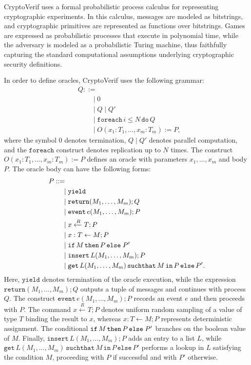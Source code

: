CryptoVerif uses a formal probabilistic process calculus for representing cryptographic experiments. In this calculus, messages are modeled as bitstrings, and cryptographic primitives are represented as functions over bitstrings. Games are expressed as probabilistic processes that execute in polynomial time, while the adversary is modeled as a probabilistic Turing machine, thus faithfully capturing the standard computational assumptions underlying cryptographic security definitions.

In order to define oracles, CryptoVerif uses the following grammar:
\begin{align*}
&Q ::= \\
&\qquad \mid 0 \\
&\qquad \mid Q \mid Q' \\
&\qquad \mid \mathtt{foreach}\,i \leq N\, \mathtt{do}\, Q \\
&\qquad \mid O(x_1: T_1, \dots, x_m : T_m) := P,
\end{align*}
where the symbol 0 denotes termination, $Q \mid Q'$ denotes parallel computation, and the $\mathtt{foreach}$ construct denotes replication up to $N$ times. The construct $O(x_1: T_1, \dots, x_m : T_m) := P$ defines an oracle with parameters $x_1, \dots, x_m$ and body $P$. The oracle body can have the following forms:
\begin{align*}
&P ::= \\
&\qquad \mid \mathtt{yield} \\
&\qquad \mid \mathtt{return}(M_1, \dots, M_m); Q \\
&\qquad \mid \mathtt{event}\, e(M_1, \dots, M_m); P \\
&\qquad \mid x \xleftarrow{R} T; P \\
&\qquad \mid x: T \leftarrow M; P \\
&\qquad \mid \mathtt{if}\,M\,\mathtt{then}\, P\,\mathtt{else}\; P' \\
&\qquad \mid \mathtt{insert}\, L(M_1, \dots, M_m); P \\
&\qquad \mid \mathtt{get}\, L(M_1, \dots, M_m)\,\mathtt{suchthat}\, M\, \mathtt{in}\, P\, \mathtt{else}\, P'. \\
\end{align*}
Here, $\mathtt{yield}$ denotes termination of the oracle execution, while the expression $\mathtt{return}(M_1, \dots, M_m); Q$ outputs a tuple of messages and continues with process  $Q$. The construct $\mathtt{event}\, e(M_1, \dots, M_m); P$ records an event $e$ and then proceeds with $P$. The command $x \xleftarrow{R} T; P$ denotes uniform random sampling of a value of type 
$T$ binding the result to $x$, whereas $x: T \leftarrow M; P$ represents deterministic assignment. The conditional $\mathtt{if}\,M\,\mathtt{then}\, P\,\mathtt{else}\; P'$ branches on the boolean value of $M$. Finally, $\mathtt{insert}\, L(M_1, \dots, M_m); P$ adds an entry to a list $L$, while $\mathtt{get}\, L(M_1, \dots, M_m)\,\mathtt{suchthat}\, M\, \mathtt{in}\, P\, \mathtt{else}\, P'$ performs a lookup in $L$ satisfying the condition $M$, proceeding with $P$ if successful and with $P'$ otherwise. 

